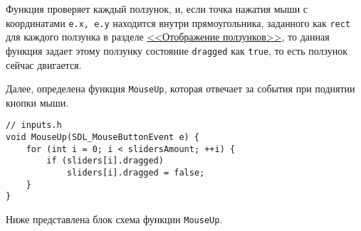 \documentclass[14pt]{extarticle}
\begin{document}
{\begin{center}
    \end{center}

    \begin{spacing}{1.5}
        Функция проверяет каждый ползунок, и, если точка нажатия мыши с координатами \verb|e.x, e.y| находится внутри прямоугольника, заданного как \verb|rect| для каждого ползунка в разделе \hyperref[sec:sliders]{<<Отображение ползунков>>}, то данная функция задает этому ползунку состояние \verb|dragged| как \verb|true|, то есть ползунок сейчас двигается.
        \par
        Далее, определена функция \verb|MouseUp|, которая отвечает за события при поднятии кнопки мыши.
    \end{spacing}

    \begin{lstlisting}
// inputs.h
void MouseUp(SDL_MouseButtonEvent e) {
	for (int i = 0; i < slidersAmount; ++i) {
		if (sliders[i].dragged)
			sliders[i].dragged = false;
	}
}\end{lstlisting}

    \begin{spacing}{1.5}
        \noindent
        Ниже представлена блок схема функции \verb|MouseUp|.
    \end{spacing}

    \vspace{-0.5em}
    
}
\end{document}
